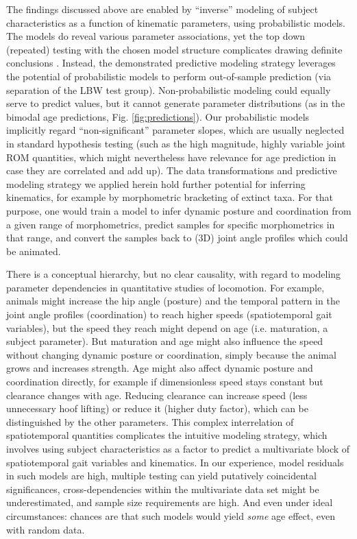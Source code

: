 The findings discussed above are enabled by ``inverse'' modeling of subject characteristics as a function of kinematic parameters, using probabilistic models.
The models do reveal various parameter associations, yet the top down (repeated) testing with the chosen model structure complicates drawing definite conclusions \citep[e.g. we observed a sex effect on size, but opposite of what other studies have reported,][we conclude males in our study were just smaller by chance]{Baxter2012}.
Instead, the demonstrated predictive modeling strategy \citep{Shmueli2010} leverages the potential of probabilistic models to perform out-of-sample prediction (via separation of the LBW test group).
Non-probabilistic modeling could equally serve to predict values, but it cannot generate parameter distributions (as in the bimodal age predictions, Fig. \ref{fig:predictions}).
Our probabilistic models implicitly regard ``non-significant'' parameter slopes, which are usually neglected in standard hypothesis testing (such as the high magnitude, highly variable joint ROM quantities, which might nevertheless have relevance for age prediction in case they are correlated and add up).
The data transformations and predictive modeling strategy we applied herein hold further potential for inferring kinematics, for example by morphometric bracketing of extinct taxa.
For that purpose, one would train a model to infer dynamic posture and coordination from a given range of morphometrics, predict samples for specific morphometrics in that range, and convert the samples back to (3D) joint angle profiles which could be animated.


There is a conceptual hierarchy, but no clear causality, with regard to modeling parameter dependencies in quantitative studies of locomotion.
For example, animals might increase the hip angle (posture) and the temporal pattern in the joint angle profiles (coordination) to reach higher speeds (spatiotemporal gait variables), but the speed they reach might depend on age (i.e. maturation, a subject parameter).
But maturation and age might also influence the speed without changing dynamic posture or coordination, simply because the animal grows and increases strength.
Age might also affect dynamic posture and coordination directly, for example if dimensionless speed stays constant but clearance changes with age.
Reducing clearance can increase speed (less unnecessary hoof lifting) or reduce it (higher duty factor), which can be distinguished by the other parameters.
This complex interrelation of spatiotemporal quantities complicates the intuitive modeling strategy, which involves using subject characteristics as a factor to predict a multivariate block of spatiotemporal gait variables and kinematics.
In our experience, model residuals in such models are high, multiple testing can yield putatively coincidental significances, cross-dependencies within the multivariate data set might be underestimated, and sample size requirements are high.
And even under ideal circumstances: chances are that such models would yield \emph{some} age effect, even with random data.

